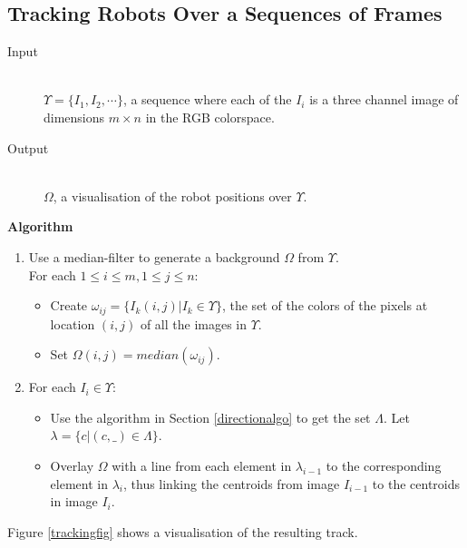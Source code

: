 \documentclass[10pt,a4paper]{article}
\begin{document}
\subsection{Tracking Robots Over a Sequences of Frames}\label{trackingalgo}
\begin{description}
\item[Input] \hfill \\
    $\Upsilon = \{I_1, I_2, \cdots\}$, a sequence where each of the $I_i$ is a 
    three channel image of dimensions $m \times n$ in the RGB colorspace.
\item[Output] \hfill \\
    $\Omega$, a visualisation of the robot positions over $\Upsilon$.
\end{description}
\textbf{Algorithm}
\begin{enumerate}
    \item
    Use a median-filter to generate a background $\Omega$ from $\Upsilon$. \\
    For each $1 \le i \le m, 1 \le j \le n$:
    \begin{itemize}
        \item
        Create $\omega_{ij} = \{I_k(i,j) | I_k \in \Upsilon\}$, the set of the 
        colors of the pixels at location $(i,j)$ of all the images in 
        $\Upsilon$.
        \item
        Set $\Omega(i,j) = median(\omega_{ij})$.
    \end{itemize}
    \item
    For each $I_i \in \Upsilon$:
    \begin{itemize}
        \item
        Use the algorithm in Section \ref{directionalgo} to get the set 
        $\Lambda$. Let $\lambda = \{c | (c, \_) \in \Lambda\}$.
        \item
        Overlay $\Omega$ with a line from each element in $\lambda_{i-1}$ to 
        the corresponding element in $\lambda_i$, thus linking the centroids 
        from image $I_{i-1}$ to the centroids in image $I_i$.
    \end{itemize}
\end{enumerate} 
Figure \ref{trackingfig} shows a visualisation of the resulting track.
\end{document}
